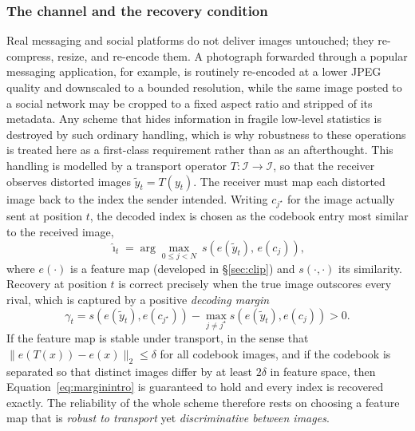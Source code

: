 \documentclass[10pt,a4paper]{article}
\theoremstyle{definition}
\begin{document}
\subsubsection{The channel and the recovery condition}\label{sec:channel}
Real messaging and social platforms do not deliver images untouched; they
re-compress, resize, and re-encode them. A photograph forwarded through a popular
messaging application, for example, is routinely re-encoded at a lower JPEG quality
and downscaled to a bounded resolution, while the same image posted to a social
network may be cropped to a fixed aspect ratio and stripped of its metadata. Any
scheme that hides information in fragile low-level statistics is destroyed by such
ordinary handling, which is why robustness to these operations is treated here as a
first-class requirement rather than as an afterthought. This handling is modelled by
a transport operator
$T:\mathcal{I}\to\mathcal{I}$, so that the receiver observes distorted images
$\tilde y_t = T(y_t)$. The receiver must map each distorted image back to the
index the sender intended. Writing $c_{j^\star}$ for the image actually sent at
position $t$, the decoded index is chosen as the codebook entry most similar to
the received image,
\begin{equation}
  \hat\imath_t = \arg\max_{0\le j<N}\ s\!\left(e(\tilde y_t),\,e(c_j)\right),
  \label{eq:nnintro}
\end{equation}
where $e(\cdot)$ is a feature map (developed in \S\ref{sec:clip}) and $s(\cdot,\cdot)$
its similarity. Recovery at position $t$ is correct precisely when the true image
outscores every rival, which is captured by a positive \emph{decoding margin}
\begin{equation}
  \gamma_t = s\!\left(e(\tilde y_t),e(c_{j^\star})\right)
           - \max_{j\neq j^\star} s\!\left(e(\tilde y_t),e(c_j)\right) > 0 .
  \label{eq:marginintro}
\end{equation}
If the feature map is stable under transport, in the sense that
$\lVert e(T(x))-e(x)\rVert_2\le\delta$ for all codebook images, and if the codebook
is separated so that distinct images differ by at least $2\delta$ in feature space,
then Equation~\eqref{eq:marginintro} is guaranteed to hold and every index is recovered
exactly. The reliability of the whole scheme therefore rests on choosing a feature
map that is \emph{robust to transport} yet \emph{discriminative between images}.
\end{document}

